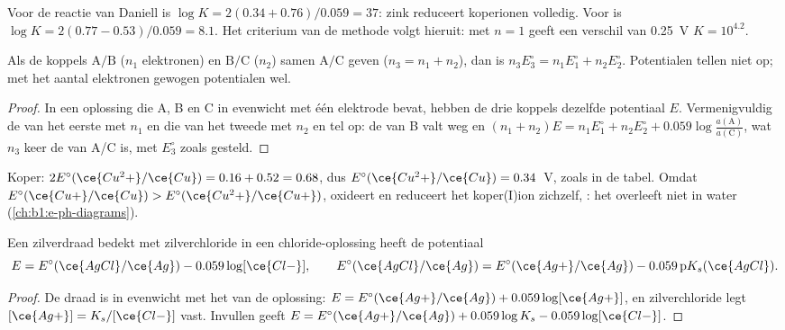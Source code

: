 Voor de reactie van Daniell is $\log K = 2(0.34 + 0.76)/0.059 = 37$: zink
reduceert koperionen volledig. Voor  is
$\log K = 2(0.77 - 0.53)/0.059 = 8.1$. Het criterium van de methode
volgt hieruit: met $n = 1$ geeft een verschil van \qty{0.25}{V}
$K = 10^{4.2}$.

\begin{proposition}\label{prop:b1:nernst:combined-potentials}
Als de koppels $\mathrm{A}/\mathrm{B}$ ($n_1$ elektronen) en
$\mathrm{B}/\mathrm{C}$ ($n_2$) samen $\mathrm{A}/\mathrm{C}$ geven
($n_3 = n_1 + n_2$), dan is $n_3 E^\circ_3 = n_1 E^\circ_1 + n_2 E^\circ_2$.
Potentialen tellen niet op; met het aantal elektronen gewogen
potentialen wel.
\end{proposition}

\begin{proof}
In een oplossing die A, B en C in evenwicht met één elektrode bevat,
hebben de drie koppels dezelfde potentiaal $E$. Vermenigvuldig de
 van het eerste met $n_1$ en die van het tweede
met $n_2$ en tel op: de  van B valt weg en $(n_1 + n_2)E = n_1E^\circ_1 + n_2E^\circ_2 +
0.059\log\frac{a(\mathrm{A})}{a(\mathrm{C})}$, wat $n_3$ keer de
 van A/C is, met $E^\circ_3$ zoals gesteld.
\end{proof}

Koper: $2E^\circ(\ce{Cu^2+}/\ce{Cu}) = 0.16 + 0.52 = 0.68$, dus
$E^\circ(\ce{Cu^2+}/\ce{Cu}) = 0.34$~V, zoals in de tabel. Omdat
$E^\circ(\ce{Cu+}/\ce{Cu}) > E^\circ(\ce{Cu^2+}/\ce{Cu+})$, oxideert en
reduceert het koper(I)ion zichzelf, : het
overleeft niet in water (\cref{ch:b1:e-ph-diagrams}).

\begin{proposition}\label{prop:b1:nernst:second-kind}
Een zilverdraad bedekt met zilverchloride in een chloride-oplossing heeft
de potentiaal
\[
  E = E^\circ(\ce{AgCl}/\ce{Ag}) - 0.059\log[\ce{Cl-}], \qquad
  E^\circ(\ce{AgCl}/\ce{Ag}) = E^\circ(\ce{Ag+}/\ce{Ag}) - 0.059\,\mathrm{p}K_s(\ce{AgCl}) .
\]
\end{proposition}

\begin{proof}
De draad is in evenwicht met het  van de oplossing:
$E = E^\circ(\ce{Ag+}/\ce{Ag}) + 0.059\log[\ce{Ag+}]$, en zilverchloride
legt $[\ce{Ag+}] = K_s/[\ce{Cl-}]$ vast. Invullen geeft
$E = E^\circ(\ce{Ag+}/\ce{Ag}) + 0.059\log K_s - 0.059\log[\ce{Cl-}]$.
\end{proof}

